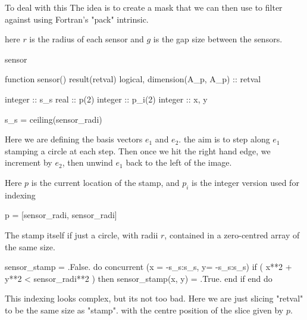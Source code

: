 \documentclass[10pt, a4paper]{article}
\begin{document}
To deal with this The idea is to create a mask that we can then use to filter against using Fortran's "pack" intrinsic.

here $r$ is the radius of each sensor and $g$ is the gap size between the sensors.

\begin{codeblock}{sensor}
\begin{code}
function sensor() result(retval)
	logical, dimension(A_p, A_p) :: retval
	
	integer :: s_s 
	real :: p(2)
	integer :: p_i(2)
	integer :: x, y
	
	s_s = ceiling(sensor_radi)
\end{code}

Here we are defining the basis vectors $e_1$ and $e_2$. the aim is to step along $e_1$ stamping a circle at each step. 
Then once we hit the right hand edge, we increment by $e_2$, then unwind $e_1$ back to the left of the image. 

\begin{figure}[h!]
\centering
{}
\end{figure}

Here $p$ is the current location of the stamp, and $p_i$ is the integer version used for indexing
\begin{code}
	p = [sensor_radi, sensor_radi]
\end{code}

The stamp itself if just a circle, with radii $r$, contained in a zero-centred array of the same size.

\begin{code}
	sensor_stamp = .False.
	do concurrent (x = -s_s:s_s, y= -s_s:s_s)
		if ( x**2 + y**2 < sensor_radi**2 ) then 
			sensor_stamp(x, y) = .True.
		end if 
	end do
\end{code}

This indexing looks complex, but its not too bad. Here we are just slicing "retval" to be the same size as "stamp". with the centre position of the slice given by $p$.


\end{codeblock}
\end{document}

